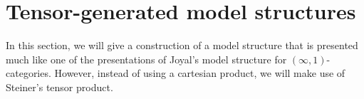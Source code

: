 \section{Tensor-generated model structures}
In this section, we will give a construction of a model structure that is presented much like one of the presentations of Joyal's model structure for \((\infty,1)\)-categories.  However, instead of using a cartesian product, we will make use of Steiner's tensor product.  